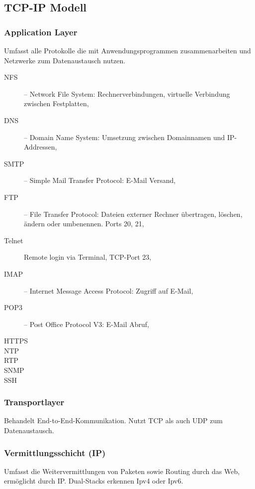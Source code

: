 \documentclass{scrartcl}
\begin{document}
    \subsection{TCP-IP Modell}
    \subsubsection{Application Layer}
    \label{subsubsection:TCP_application_layer}
    Umfasst alle Protokolle die mit Anwendungsprogrammen zusammenarbeiten und Netzwerke zum Datenaustausch nutzen.
    \begin{description}
        \item [NFS] -- Network File System: Rechnerverbindungen, virtuelle Verbindung zwischen Festplatten,
        \item [DNS] -- Domain Name System: Umsetzung zwischen Domainnamen und IP-Addressen,
        \item [SMTP] -- Simple Mail Transfer Protocol: E-Mail Versand,
        \item [FTP] -- File Transfer Protocol: Dateien externer Rechner übertragen, löschen, ändern oder umbenennen. Ports 20, 21,
        \item [Telnet] Remote login via Terminal, TCP-Port 23,
        \item [IMAP] -- Internet Message Access Protocol: Zugriff auf E-Mail,
        \item [POP3] -- Post Office Protocol V3: E-Mail Abruf,
        \item [HTTPS]
        \item [NTP]
        \item [RTP]
        \item [SNMP]
        \item [SSH]
    \end{description}
    
    \subsubsection{Transportlayer}
    \label{subsubsection:TCP_transport_layer}
    Behandelt End-to-End-Kommunikation. Nutzt TCP als auch UDP zum Datenaustausch. 
    
    \subsubsection{Vermittlungsschicht (IP)}
    \label{subsubsection:TCP_ip_layer}
    Umfasst die Weitervermittlungen von Paketen sowie Routing durch das Web, ermöglicht durch IP. 
    Dual-Stacks erkennen Ipv4 oder Ipv6.
\end{document}
